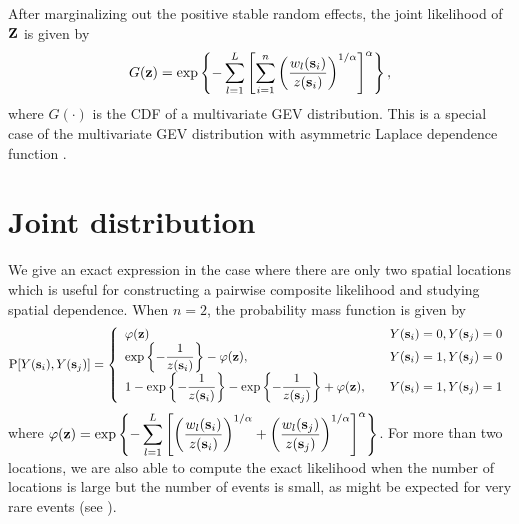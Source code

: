 \documentclass[11pt]{article}
\begin{document}
After marginalizing out the positive stable random effects, the joint likelihood of $\mbox{\bf Z}$ is given by
\begin{align}\label{rbeq:jointCDF}
  G(\mbox{\bf z}) = \exp\left\{-\sum_{l=1}^L\left[\sum_{i=1}^n\left(\frac{w_{l}(\mbox{\bf s}_i)}{z(\mbox{\bf s}_i)}\right)^{1/\alpha}\right]^{\alpha}\right\},
\end{align}
where $G(\cdot)$ is the CDF of a multivariate GEV distribution.
This is a special case of the multivariate GEV distribution with asymmetric Laplace dependence function \citep{Tawn1990}.




\section{Joint distribution}\label{rbs:multivariate}
We give an exact expression in the case where there are only two spatial locations which is useful for constructing a pairwise composite likelihood \citep{Padoan2010} and studying spatial dependence.
When $n = 2$, the probability mass function is given by
\begin{align} \label{rbeq:biv}
  \text{P}[Y(\mbox{\bf s}_i), Y(\mbox{\bf s}_j)] = \left\{ \begin{array}{ll}
    \varphi(\mbox{\bf z}) &Y(\mbox{\bf s}_i) = 0, Y(\mbox{\bf s}_j) = 0\\
    \exp\left\{ - \displaystyle \frac{ 1 }{ z(\mbox{\bf s}_i) } \right\} - \varphi(\mbox{\bf z}), &Y(\mbox{\bf s}_i) = 1, Y(\mbox{\bf s}_j) = 0 \\
    1 - \exp\left\{ - \displaystyle\frac{ 1 }{ z(\mbox{\bf s}_i) } \right\} - \exp \left\{ -\displaystyle \frac{ 1 }{z(\mbox{\bf s}_j)} \right\} + \varphi(\mbox{\bf z}), \quad &Y(\mbox{\bf s}_i) = 1, Y(\mbox{\bf s}_j) = 1
  \end{array} \right.
\end{align}
where $\varphi(\mbox{\bf z}) = \exp \left\{ - \displaystyle \sum_{ l = 1 }^{ L } \left[ \left( \displaystyle \frac{ w_{ l }(\mbox{\bf s}_i) }{ z(\mbox{\bf s}_i) } \right)^{1/\alpha} + \left( \displaystyle \frac{ w_{l }(\mbox{\bf s}_j)}{z(\mbox{\bf s}_j)} \right)^{1/\alpha} \right]^{\alpha} \right\}$.
For more than two locations, we are also able to compute the exact likelihood when the number of locations is large but the number of events is small, as might be expected for very rare events (see ).
\end{document}
